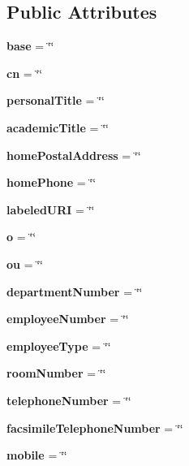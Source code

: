 \subsection*{Public Attributes}
\begin{CompactItemize}
\item 
{\bf base} = \char`\"{}\char`\"{}\label{classuser_o0}

\item 
{\bf cn} = \char`\"{}\char`\"{}\label{classuser_o1}

\item 
{\bf personal\-Title} = \char`\"{}\char`\"{}\label{classuser_o2}

\item 
{\bf academic\-Title} = \char`\"{}\char`\"{}\label{classuser_o3}

\item 
{\bf home\-Postal\-Address} = \char`\"{}\char`\"{}\label{classuser_o4}

\item 
{\bf home\-Phone} = \char`\"{}\char`\"{}\label{classuser_o5}

\item 
{\bf labeled\-URI} = \char`\"{}\char`\"{}\label{classuser_o6}

\item 
{\bf o} = \char`\"{}\char`\"{}\label{classuser_o7}

\item 
{\bf ou} = \char`\"{}\char`\"{}\label{classuser_o8}

\item 
{\bf department\-Number} = \char`\"{}\char`\"{}\label{classuser_o9}

\item 
{\bf employee\-Number} = \char`\"{}\char`\"{}\label{classuser_o10}

\item 
{\bf employee\-Type} = \char`\"{}\char`\"{}\label{classuser_o11}

\item 
{\bf room\-Number} = \char`\"{}\char`\"{}\label{classuser_o12}

\item 
{\bf telephone\-Number} = \char`\"{}\char`\"{}\label{classuser_o13}

\item 
{\bf facsimile\-Telephone\-Number} = \char`\"{}\char`\"{}\label{classuser_o14}

\item 
{\bf mobile} = \char`\"{}\char`\"{}\label{classuser_o15}


\end{CompactItemize}
